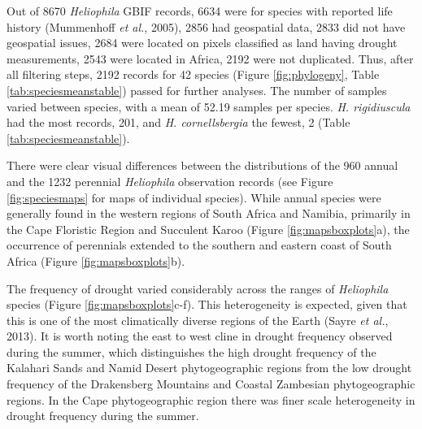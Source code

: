 \documentclass[man,floatsintext]{apa6}
\theoremstyle{definition}
\theoremstyle{definition}
\theoremstyle{definition}
\theoremstyle{remark}
\begin{document}
Out of 8670 \emph{Heliophila} GBIF records, 6634 were for species with
reported life history (Mummenhoff \emph{et al.}, 2005), 2856 had
geospatial data, 2833 did not have geospatial issues, 2684 were located
on pixels classified as land having drought measurements, 2543 were
located in Africa, 2192 were not duplicated. Thus, after all filtering
steps, 2192 records for 42 species (Figure \ref{fig:phylogeny}, Table
\ref{tab:speciesmeanstable}) passed for further analyses. The number of
samples varied between species, with a mean of 52.19 samples per
species. \emph{H. rigidiuscula} had the most records, 201, and \emph{H.
cornellsbergia} the fewest, 2 (Table \ref{tab:speciesmeanstable}).

There were clear visual differences between the distributions of the 960
annual and the 1232 perennial \emph{Heliophila} observation records (see
Figure \ref{fig:speciesmaps} for maps of individual species). While
annual species were generally found in the western regions of South
Africa and Namibia, primarily in the Cape Floristic Region and Succulent
Karoo (Figure \ref{fig:mapsboxplots}a), the occurrence of perennials
extended to the southern and eastern coast of South Africa (Figure
\ref{fig:mapsboxplots}b).

The frequency of drought varied considerably across the ranges of
\emph{Heliophila} species (Figure \ref{fig:mapsboxplots}c-f). This
heterogeneity is expected, given that this is one of the most
climatically diverse regions of the Earth (Sayre \emph{et al.}, 2013).
It is worth noting the east to west cline in drought frequency observed
during the summer, which distinguishes the high drought frequency of the
Kalahari Sands and Namid Desert phytogeographic regions from the low
drought frequency of the Drakensberg Mountains and Coastal Zambesian
phytogeographic regions. In the Cape phytogeographic region there was
finer scale heterogeneity in drought frequency during the summer.
\end{document}
